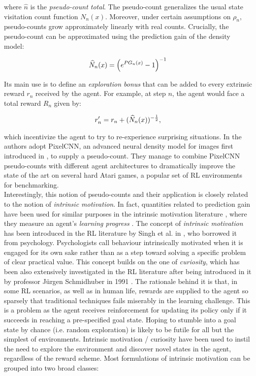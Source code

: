 where $\hat{n}$ is the \emph{pseudo-count total}. The pseudo-count generalizes the usual state visitation count function $N_n(x)$. Moreover, under certain assumptions on $\rho_n$, pseudo-counts grow approximately linearly with real counts. Crucially, the pseudo-count can be approximated using the prediction gain of the density model:

\begin{align}
\widehat{N}_n(x) = \left(e^{PG_n(x)}-1\right)^{-1}
\end{align}

Its main use is to define an \emph{exploration bonus} that can be added to every extrinsic reward $r_n$ received by the agent. For example, at step $n$, the agent would face a total reward $R_n$ given by:

\begin{align}
r'_n = r_n + (\widehat{N}_n(x))^{-\frac{1}{2}},
\end{align}

which incentivize the agent to try to re-experience surprising situations. In \cite{ostrovski2017count} the authors adopt PixelCNN, an advanced neural density model for images first introduced in \cite{oord2016pixel}, to supply a pseudo-count. They manage to combine PixelCNN pseudo-counts with different agent architectures to dramatically improve the
state of the art on several hard Atari games, a popular set of \gls{RL} environments for  benchmarking. \\

Interestingly, this notion of pseudo-counts and their application is closely related to the notion of \emph{intrinsic motivation}. In fact, quantities related to prediction gain have been used for similar purposes in the intrinsic motivation literature \cite{lopes2012exploration}, where they measure an agent’s \emph{learning progress} \cite{oudeyer2007intrinsic}. The concept of \emph{intrinsic motivation} has been introduced in the \gls{RL} literature by Singh et al. in \cite{chentanez2005intrinsically}, who borrowed it from psychology. Psychologists call behaviour intrinsically motivated when it is engaged for its own sake rather than as a step toward solving a specific problem of clear practical value. This concept builds on the one of \emph{curiosity}, which has been also extensively investigated in the \gls{RL} literature after being introduced in it by professor Jürgen Schmidhuber in 1991 \cite{schmidhuber1991possibility}. The rationale behind it is that, in some \gls{RL} scenarios, as well as in human life, rewards are supplied to the agent so sparsely that traditional techniques fails miserably in the learning challenge. This is a problem as the agent receives reinforcement for updating its policy only if it succeeds in reaching a pre-specified goal state. Hoping to stumble into a goal state by chance (i.e. random exploration) is likely to be futile for all but the simplest of environments. Intrinsic motivation / curiosity have been used to instil the need to explore the environment and discover novel states in the agent, regardless of the reward scheme. Most formulations of intrinsic motivation can be grouped into two broad classes:


